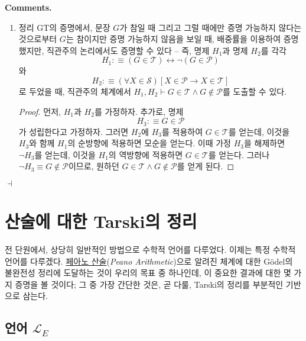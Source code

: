 \documentclass[12pt]{paper}
\newenvironment{context}[1][]
{ \noindent \textbf{{#1}.}
}
{ \hfill $ \dashv $
}
\begin{document}
  \begin{context}[Comments]
    \begin{enumerate}
      \item 정리 GT의 증명에서,
      문장 $G$가 참일 때 그리고 그럴 때에만 증명 가능하지 않다는 것으로부터 $G$는 참이지만 증명 가능하지 않음을 보일 때,
      배중률을 이용하여 증명했지만, 직관주의 논리에서도 증명할 수 있다 --
      즉, 명제 $H_{1}$과 명제 $H_{2}$를 각각
      $$H_{1} : \equiv \left( G \in \mathcal{T} \right) \leftrightarrow \lnot \left( G \in \mathcal{P} \right) $$와
      $$ H_{2} : \equiv \left( \forall X \in \mathcal{S} \right) \left[ X \in \mathcal{P} \rightarrow X \in \mathcal{T} \right]$$로
      두었을 때,
      직관주의 체계에서 $H_{1} , H_{2} \vdash G \in \mathcal{T} \land G \notin \mathcal{P}$를 도출할 수 있다.

      \begin{proof}
        먼저, $H_{1}$과 $H_{2}$를 가정하자.
        추가로, 명제 $$H_{3} : \equiv G \in \mathcal{P}$$가 성립한다고 가정하자.
        그러면 $H_{2}$에 $H_{3}$를 적용하여 $G \in \mathcal{T}$를 얻는데,
        이것을 $H_{3}$와 함께 $H_{1}$의 순방향에 적용하면 모순을 얻는다.
        이때 가정 $H_{3}$을 해제하면 $\lnot H_{3}$를 얻는데,
        이것을 $H_{1}$의 역방향에 적용하면 $G \in \mathcal{T}$를 얻는다.
        그러나 $\lnot H_{3} \equiv G \notin \mathcal{P}$이므로,
        원하던 $G \in \mathcal{T} \land G \notin \mathcal{P}$를 얻게 된다.
      \end{proof}
    \end{enumerate}
  \end{context}

  \newpage

  \section{산술에 대한 Tarski의 정리}
  \hspace{12pt}

  전 단원에서, 상당히 일반적인 방법으로 수학적 언어를 다루었다.
  이제는 특정 수학적 언어를 다루겠다.
  \underline{페아노 산술}(\textit{Peano Arithmetic})으로 알려진 체계에 대한
  G\"odel의 불완전성 정리에 도달하는 것이 우리의 목표 중 하나인데,
  이 중요한 결과에 대한 몇 가지 증명을 볼 것이다;
  그 중 가장 간단한 것은, 곧 다룰, Tarski의 정리를 부분적인 기반으로 삼는다.

  \subsection{언어 $\mathcal{L}_{E}$}
  \hspace{12pt}
\end{document}
